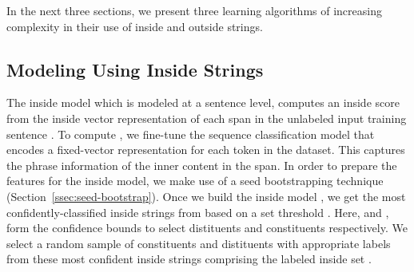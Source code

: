 \documentclass[11pt]{article}
\newcommand{\ignore}[1]{}
\begin{document}
In the next three sections, we present three learning algorithms of increasing complexity in their use of inside and outside strings.

\subsection{Modeling Using Inside Strings}
\label{ssec:inside-algorithm}
The inside model  which is modeled at a sentence level, computes an inside score  from the inside vector representation  of each span in the unlabeled input training sentence . To compute , we fine-tune the sequence classification model that encodes a fixed-vector representation for each token in the dataset.\ignore{ I think the reviewers intention here was that it needs to be clear what you use - in this case ROBERTa, so maybe just briefly mention ROBERTa in a footnote and say that it will become more clear later. finally, that sentence "To compute..." is not clear to me. Can you explain to me in an email what you mean?} This captures the phrase information of the inner content in the span. In order to prepare the features for the inside model, we make use of a seed bootstrapping technique (Section~\ref{ssec:seed-bootstrap}). Once we build the inside model , we get the most confidently-classified inside strings from  based on a set threshold . Here,  and , form the confidence bounds to select distituents and constituents respectively. We select a random sample of  constituents and  distituents with appropriate labels from these most confident inside strings comprising the labeled inside set .
\end{document}
